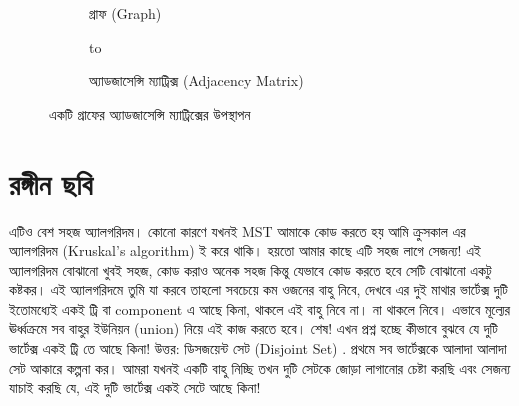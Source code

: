 \newsavebox{\tempbox}

\begin{figure}
\begin{subfigure}{.5\textwidth}
    \centering
    \usebox{\tempbox}
\caption{গ্রাফ (Graph)}
\end{subfigure}%
\begin{subfigure}{.5\textwidth}
    \centering
    \vbox to\ht{}
    \caption{অ্যাডজাসেন্সি ম্যাট্রিক্স (Adjacency Matrix)}
\end{subfigure}%
\caption{একটি গ্রাফের অ্যাডজাসেন্সি ম্যাট্রিক্সের উপস্থাপন}
			\label{fig:adjmat}
\end{figure}

\section{রঙ্গীন ছবি}

এটিও বেশ সহজ অ্যালগরিদম। কোনো কারণে যখনই MST আমাকে কোড করতে হয় আমি ক্রুসকাল এর অ্যালগরিদম (Kruskal's algorithm) ই করে থাকি। হয়তো আমার কাছে এটি সহজ লাগে সেজন্য! এই অ্যালগরিদম বোঝানো খুবই সহজ, কোড করাও অনেক সহজ কিন্তু যেভাবে কোড করতে হবে সেটি বোঝানো একটু কষ্টকর। এই অ্যালগরিদমে তুমি যা করবে তাহলো সবচেয়ে কম ওজনের বাহু নিবে, দেখবে এর দুই মাথার ভার্টেক্স দুটি ইতোমধ্যেই একই ট্রি বা component এ আছে কিনা, থাকলে এই বাহু নিবে না। না থাকলে নিবে। এভাবে মূল্যের ঊর্ধ্বক্রমে সব বাহুর ইউনিয়ন (union) নিয়ে এই কাজ করতে হবে। শেষ! এখন প্রশ্ন হচ্ছে কীভাবে বুঝবে যে দুটি ভার্টেক্স একই ট্রি তে আছে কিনা! উত্তর: ডিসজয়েন্ট সেট (Disjoint Set) . প্রথমে সব ভার্টেক্সকে আলাদা আলাদা সেট আকারে কল্পনা কর। আমরা যখনই একটি বাহু নিচ্ছি তখন দুটি সেটকে জোড়া লাগানোর চেষ্টা করছি এবং সেজন্য যাচাই করছি যে, এই দুটি ভার্টেক্স একই সেটে আছে কিনা! 

